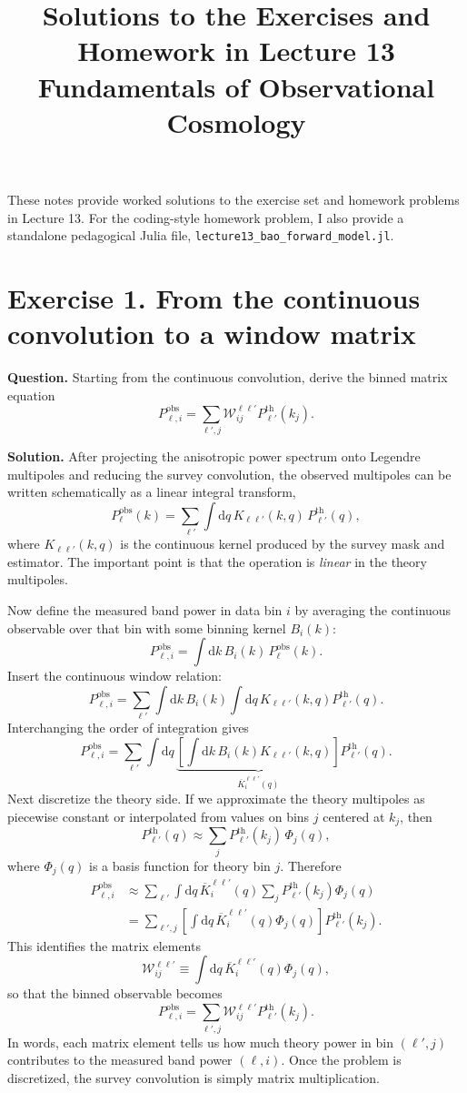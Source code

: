 \documentclass[11pt]{article}
\title{Solutions to the Exercises and Homework in Lecture 13\\Fundamentals of Observational Cosmology}
\author{}
\date{}
\newcommand{\dd}{\mathrm{d}}
\newcommand{\obs}{\mathrm{obs}}
\newcommand{\thm}{\mathrm{th}}
\begin{document}
\maketitle

These notes provide worked solutions to the exercise set and homework problems in Lecture 13.
For the coding-style homework problem, I also provide a standalone pedagogical Julia file,
\texttt{lecture13\_bao\_forward\_model.jl}.

\section*{Exercise 1. From the continuous convolution to a window matrix}
\textbf{Question.} Starting from the continuous convolution, derive the binned matrix equation
\[
P^{\obs}_{\ell,i}=\sum_{\ell',j}\mathcal{W}^{\ell\ell'}_{ij}P^{\thm}_{\ell'}(k_j).
\]

\bigskip
\textbf{Solution.}
After projecting the anisotropic power spectrum onto Legendre multipoles and reducing the survey convolution, the observed multipoles can be written schematically as a linear integral transform,
\[
P^{\obs}_{\ell}(k)=\sum_{\ell'}\int \dd q\,K_{\ell\ell'}(k,q)\,P^{\thm}_{\ell'}(q),
\]
where $K_{\ell\ell'}(k,q)$ is the continuous kernel produced by the survey mask and estimator. The important point is that the operation is \emph{linear} in the theory multipoles.

Now define the measured band power in data bin $i$ by averaging the continuous observable over that bin with some binning kernel $B_i(k)$:
\[
P^{\obs}_{\ell,i}=\int \dd k\,B_i(k)\,P^{\obs}_{\ell}(k).
\]
Insert the continuous window relation:
\[
P^{\obs}_{\ell,i}=\sum_{\ell'}\int \dd k\,B_i(k)\int \dd q\,K_{\ell\ell'}(k,q)P^{\thm}_{\ell'}(q).
\]
Interchanging the order of integration gives
\[
P^{\obs}_{\ell,i}=\sum_{\ell'}\int \dd q\,\underbrace{\left[\int \dd k\,B_i(k)K_{\ell\ell'}(k,q)\right]}_{\overline K^{\ell\ell'}_i(q)}P^{\thm}_{\ell'}(q).
\]
Next discretize the theory side. If we approximate the theory multipoles as piecewise constant or interpolated from values on bins $j$ centered at $k_j$, then
\[
P^{\thm}_{\ell'}(q)\approx \sum_j P^{\thm}_{\ell'}(k_j)\,\Phi_j(q),
\]
where $\Phi_j(q)$ is a basis function for theory bin $j$. Therefore
\begin{align*}
P^{\obs}_{\ell,i}
&\approx \sum_{\ell'}\int \dd q\,\overline K^{\ell\ell'}_i(q)\sum_j P^{\thm}_{\ell'}(k_j)\Phi_j(q)\\
&=\sum_{\ell',j}\left[\int \dd q\,\overline K^{\ell\ell'}_i(q)\Phi_j(q)\right]P^{\thm}_{\ell'}(k_j).
\end{align*}
This identifies the matrix elements
\[
\boxed{
\mathcal W^{\ell\ell'}_{ij}\equiv \int \dd q\,\overline K^{\ell\ell'}_i(q)\Phi_j(q),
}
\]
so that the binned observable becomes
\[
\boxed{
P^{\obs}_{\ell,i}=\sum_{\ell',j}\mathcal W^{\ell\ell'}_{ij}P^{\thm}_{\ell'}(k_j).
}
\]
In words, each matrix element tells us how much theory power in bin $(\ell',j)$ contributes to the measured band power $(\ell,i)$. Once the problem is discretized, the survey convolution is simply matrix multiplication.
\end{document}
